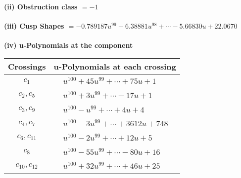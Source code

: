 \documentclass[1p]{elsarticle_modified}
\theoremstyle{definition}
\begin{document}
\flushleft \textbf{(ii) Obstruction class $= -1$}\\~\\
\flushleft \textbf{(iii) Cusp Shapes $= -0.789187 u^{99}-6.38881 u^{98}+\cdots-5.66830 u+22.0670$}\\~\\
\newpage\renewcommand{\arraystretch}{1}
\flushleft \textbf{(iv) u-Polynomials at the component}\newline \\
\begin{tabular}{m{50pt}|m{274pt}}
Crossings & \hspace{64pt}u-Polynomials at each crossing \\
\hline $$\begin{aligned}c_{1}\end{aligned}$$&$\begin{aligned}
&u^{100}+45 u^{99}+\cdots+75 u+1
\end{aligned}$\\
\hline $$\begin{aligned}c_{2},c_{5}\end{aligned}$$&$\begin{aligned}
&u^{100}+3 u^{99}+\cdots-17 u+1
\end{aligned}$\\
\hline $$\begin{aligned}c_{3},c_{9}\end{aligned}$$&$\begin{aligned}
&u^{100}- u^{99}+\cdots+4 u+4
\end{aligned}$\\
\hline $$\begin{aligned}c_{4},c_{7}\end{aligned}$$&$\begin{aligned}
&u^{100}-3 u^{99}+\cdots+3612 u+748
\end{aligned}$\\
\hline $$\begin{aligned}c_{6},c_{11}\end{aligned}$$&$\begin{aligned}
&u^{100}-2 u^{99}+\cdots+12 u+5
\end{aligned}$\\
\hline $$\begin{aligned}c_{8}\end{aligned}$$&$\begin{aligned}
&u^{100}-55 u^{99}+\cdots-80 u+16
\end{aligned}$\\
\hline $$\begin{aligned}c_{10},c_{12}\end{aligned}$$&$\begin{aligned}
&u^{100}+32 u^{99}+\cdots+46 u+25
\end{aligned}$\\
\hline
\end{tabular}\\~\\
\end{document}
